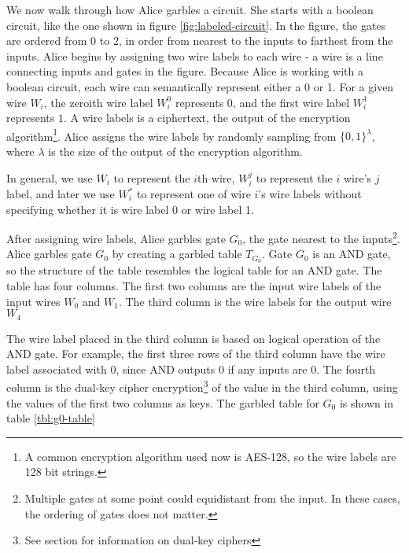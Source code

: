 



We now walk through how Alice garbles a circuit.
She starts with a boolean circuit, like the one shown in figure \ref{fig:labeled-circuit}.
In the figure, the gates are ordered from $0$ to $2$, in order from nearest to the inputs to farthest from the inputs.
Alice begins by assigning two wire labels to each wire - a wire is a line connecting inputs and gates in the figure.
Because Alice is working with a boolean circuit, each wire can semantically represent either a 0 or 1.
For a given wire $W_i$, the zeroith wire label $W_i^0$ represents $0$, and the first wire label $W_i^1$ represents $1$.
A wire labels is a ciphertext, the output of the encryption algorithm\footnote{A common encryption algorithm used now is AES-128, so the wire labels are 128 bit strings.}.
Alice assigns the wire labels by randomly sampling from $\{0,1\}^{\lambda}$, where $\lambda$ is the size of the output of the encryption algorithm.

In general, we use $W_i$ to represent the $i$th wire, $W_i^j$ to represent the $i$ wire's $j$ label, and later we use $W_i^*$ to represent one of wire $i$'s wire labels without specifying whether it is wire label 0 or wire label 1.

After assigning wire labels, Alice garbles gate $G_0$, the gate nearest to the inputs\footnote{Multiple gates at some point could equidistant from the input. In these cases, the ordering of gates does not matter.}.
Alice garbles gate $G_0$ by creating a garbled table $T_{G_0}$.
Gate $G_0$ is an AND gate, so the structure of the table resembles the logical table for an AND gate.
The table has four columns. 
The first two columns are the input wire labels of the input wires $W_0$ and $W_1$.
The third column is the wire labels for the output wire $W_4$

The wire label placed in the third column is based on logical operation of the AND gate.
For example, the first three rows of the third column have the wire label associated with $0$, since AND outputs 0 if any inputs are 0.
The fourth column is the dual-key cipher encryption\footnote{See section  for information on dual-key ciphers} of the value in the third column, using the values of the first two columns as keys.
The garbled table for $G_0$ is shown in table \ref{tbl:g0-table}

